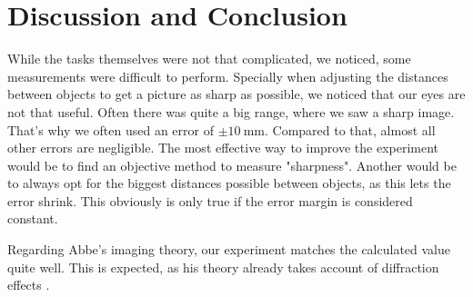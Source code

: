 \section{Discussion and Conclusion}
While the tasks themselves were not that complicated, we noticed, some measurements were difficult to perform.
Specially when adjusting the distances between objects to get a picture as sharp as possible, we noticed that our eyes are not that useful.
Often there was quite a big range, where we saw a sharp image.
That's why we often used an error of $\pm \SI{10}{\milli\meter}$.
Compared to that, almost all other errors are negligible.
The most effective way to improve the experiment would be to find an objective method to measure "sharpness".
Another would be to always opt for the biggest distances possible between objects, as this lets the error shrink.
This obviously is only true if the error margin is considered constant.

Regarding Abbe's imaging theory, our experiment matches the calculated value quite well. 
This is expected, as his theory already takes account of diffraction effects \cite{manual}.